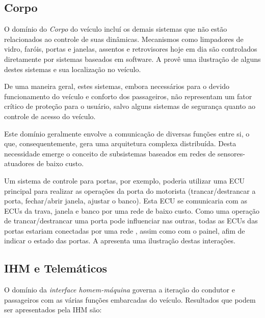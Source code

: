 \subsection{Corpo}

O domínio do \emph{Corpo} do veículo incluí os demais sistemas que não estão relacionados ao controle de suas dinâmicas. Mecanismos como limpadores de vidro, faróis, portas e janelas, assentos e retrovisores hoje em dia são controlados diretamente por sistemas baseados em software. A  provê uma ilustração de alguns destes sistemas e sua localização no veículo.


De uma maneira geral, estes sistemas, embora necessários para o devido funcionamento do veículo e conforto dos passageiros, não representam um fator crítico de proteção para o usuário, salvo alguns sistemas de segurança quanto ao controle de acesso do veículo.

Este domínio geralmente envolve a comunicação de diversas funções entre si, o que, consequentemente, gera uma arquitetura complexa distribuída. Desta necessidade emerge o conceito de subsistemas baseados em redes de sensores-atuadores de baixo custo.

Um sistema de controle para portas, por exemplo, poderia utilizar uma ECU principal para realizar as operações da porta do motorista (trancar/destrancar a porta, fechar/abrir janela, ajustar o banco). Esta ECU se comunicaria com as ECUs da trava, janela e banco por uma rede  de baixo custo. Como uma operação de trancar/destrancar uma porta pode influenciar nas outras, todas as ECUs das portas estariam conectadas por uma rede , assim como com o painel, afim de indicar o estado das portas. A  apresenta uma ilustração destas interações.


\subsection{IHM e Telemáticos}

O domínio da \emph{interface homem-máquina} governa a iteração do condutor e passageiros com as várias funções embarcadas do veículo. Resultados que podem ser apresentados pela IHM são:

